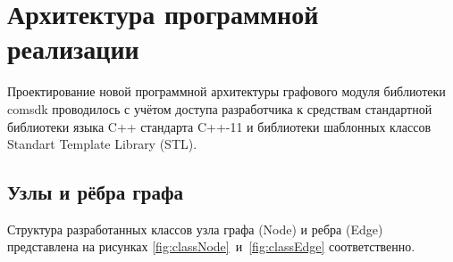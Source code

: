 \chapter{Архитектура программной реализации}\label{chap3_soft_architecture}
Проектирование новой программной архитектуры графового модуля библиотеки comsdk проводилось с учётом доступа разработчика к средствам стандартной библиотеки языка C++ стандарта C++-11 и библиотеки шаблонных классов Standart Template Library (STL).
\section{Узлы и рёбра графа}
Структура разработанных классов узла графа (\textsf{Node}) и ребра (\textsf{Edge}) представлена на рисунках \ref{fig:classNode}~и~\ref{fig:classEdge} соответственно.
